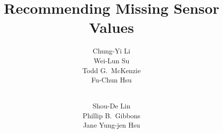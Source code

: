 \title{
Recommending Missing Sensor Values
}


\author{ %
Chung-Yi Li  \\ Wei-Lun Su \\ Todd G.\ McKenzie \\ Fu-Chun Hsu \and\\ %
Shou-De Lin \\ Phillip B.\ Gibbons \\ Jane Yung-jen Hsu %
}






\maketitle


















